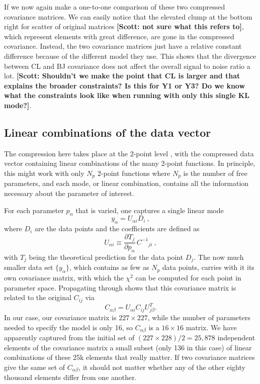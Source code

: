 \documentclass[twocolumn]{\docclass}
\newcommand\be{\begin{equation}}
\newcommand\ee{\end{equation}}
\newcommand\scott[1]{{\bf [Scott: #1]}}
\begin{document}
	If we now again make a one-to-one comparison of these two compressed covariance matrices. We can easily notice that the elevated clump at the bottom right for scatter of original matrices \scott{not sure what this refers to}, which represent elements with great difference, are gone in the compressed covariance. Instead, the two covariance matrices just have a relative constant difference because of the different model they use. This shows that the divergence between CL and BJ covariance does not affect the overall signal to noise ratio a lot. \scott{Shouldn't we make the point that CL is larger and that explains the broader constraints? Is this for Y1 or Y3? Do we know what the constraints look like when running with only this single KL mode?}.

	
	\subsection{Linear combinations of the data vector}
	
	The compression here  takes place at the 2-point level \citep{Zablocki:2015zcm}, with the compressed data vector containing linear combinations of the many 2-point functions. In principle, this might work with only $N_p$ 2-point functions where $N_p$ is the number of free parameters, and each mode, or linear combination, contains all the information necessary about the parameter of interest. 
	
	For each parameter $p_\alpha$ that is varied, one captures a single linear mode
	\be
	y_\alpha = U_{\alpha i} D_i\
	,\ee
	where $D_i$ are the data points and the coefficients are defined as
	\be \label{eq:compression_scheme}
	U_{\alpha i} \equiv \frac{\partial T_j}{\partial p_\alpha} \, C^{-1}{}_{ji}\
	,\ee
	with $T_j$ being the theoretical prediction for the data point $D_j$.
	The now much smaller data set $\{y_\alpha\}$, which contains as few as $N_p$ data points, carries with it its own covariance matrix, with which the $\chi^2$ can be computed for each point in parameter space. Propagating through shows that this covariance matrix is related to the original $C_{ij}$ via
	\be
	C_{\alpha\beta} = U_{\alpha i} C_{ij} U^T_{j\beta}.
	\ee
	In our case, our covariance matrix is  $227 \times 227$, while the number of parameters needed to specify the model is only 16, so $C_{\alpha\beta}$ is a $16\times 16$ matrix. We have apparently captured from the initial set of $(227 \times 228)/2 = 25,878$ independent elements of the covariance matrix a small subset (only 136 in this case) of linear combinations of these 25k elements that really matter. If two covariance matrices give the same set of $C_{\alpha\beta}$, it should not matter whether any of the other eighty thousand elements differ from one another.
	
\end{document}
